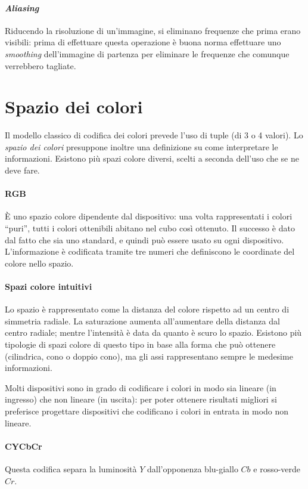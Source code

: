 \documentclass[11pt, a4page]{article}
\begin{document}
\paragraph{\textit{Aliasing}}
Riducendo la risoluzione di un'immagine, si eliminano frequenze che prima erano visibili: prima di effettuare questa operazione è buona norma effettuare uno \textit{smoothing} dell'immagine di partenza per eliminare le frequenze che comunque verrebbero tagliate.

\section{Spazio dei colori}
Il modello classico di codifica dei colori prevede l'uso di tuple (di 3 o 4 valori).
Lo \textit{spazio dei colori} presuppone inoltre una definizione su come interpretare le informazioni.
Esistono più spazi colore diversi, scelti a seconda dell'uso che se ne deve fare.

\paragraph{RGB}
È uno spazio colore dipendente dal dispositivo: una volta rappresentati i colori ``puri'', tutti i colori ottenibili abitano nel cubo così ottenuto.
Il successo è dato dal fatto che sia uno standard, e quindi può essere usato su ogni dispositivo.
L'informazione è codificata tramite tre numeri che definiscono le coordinate del colore nello spazio.

\paragraph{Spazi colore intuitivi}
Lo spazio è rappresentato come la distanza del colore rispetto ad un centro di simmetria radiale.
La saturazione aumenta all'aumentare della distanza dal centro radiale; mentre l'intensità è data da quanto è scuro lo spazio.
Esistono più tipologie di spazi colore di questo tipo in base alla forma che può ottenere (cilindrica, cono o doppio cono), ma gli assi rappresentano sempre le medesime informazioni. \newline

Molti dispositivi sono in grado di codificare i colori in modo sia lineare (in ingresso) che non lineare (in uscita): per poter ottenere risultati migliori si preferisce progettare dispositivi che codificano i colori in entrata in modo non lineare.

\paragraph{CYCbCr}
Questa codifica separa la luminosità $Y$ dall'opponenza blu-giallo $Cb$ e rosso-verde $Cr$.
\end{document}
